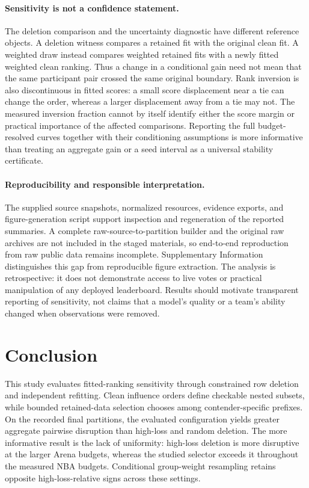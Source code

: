 \documentclass{article}
\begin{document}
\paragraph{Sensitivity is not a confidence statement.}
The deletion comparison and the uncertainty diagnostic have different reference objects. A deletion witness compares a retained fit with the original clean fit. A weighted draw instead compares weighted retained fits with a newly fitted weighted clean ranking. Thus a change in a conditional gain need not mean that the same participant pair crossed the same original boundary. Rank inversion is also discontinuous in fitted scores: a small score displacement near a tie can change the order, whereas a larger displacement away from a tie may not. The measured inversion fraction cannot by itself identify either the score margin or practical importance of the affected comparisons. Reporting the full budget-resolved curves together with their conditioning assumptions is more informative than treating an aggregate gain or a seed interval as a universal stability certificate.

\paragraph{Reproducibility and responsible interpretation.}
The supplied source snapshots, normalized resources, evidence exports, and figure-generation script support inspection and regeneration of the reported summaries. A complete raw-source-to-partition builder and the original raw archives are not included in the staged materials, so end-to-end reproduction from raw public data remains incomplete. Supplementary Information distinguishes this gap from reproducible figure extraction. The analysis is retrospective: it does not demonstrate access to live votes or practical manipulation of any deployed leaderboard. Results should motivate transparent reporting of sensitivity, not claims that a model's quality or a team's ability changed when observations were removed.

\section{Conclusion}
This study evaluates fitted-ranking sensitivity through constrained row deletion and independent refitting. Clean influence orders define checkable nested subsets, while bounded retained-data selection chooses among contender-specific prefixes. On the recorded final partitions, the evaluated configuration yields greater aggregate pairwise disruption than high-loss and random deletion. The more informative result is the lack of uniformity: high-loss deletion is more disruptive at the larger Arena budgets, whereas the studied selector exceeds it throughout the measured NBA budgets. Conditional group-weight resampling retains opposite high-loss-relative signs across these settings.
\end{document}
